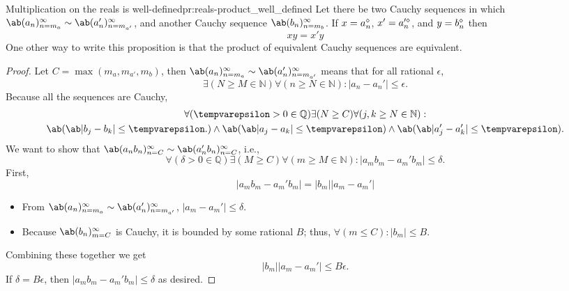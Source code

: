 \begin{prop}{Multiplication on the reals is well-defined}{pr:reals-product_well_defined}
  Let there be two Cauchy sequences in which
  $\sequence{a_n}{n = m_a}{\infty} \sim \sequence{a_n'}{n = m_{a'}}{\infty}$, and
  another Cauchy sequence $\sequence{b_n}{n = m_b}{\infty}$. If $x = a_n^{\diamond}$,
  $x' = a_n'^{\diamond}$, and $y = b_n^{\diamond}$ then
  \begin{equation}
    xy = x'y
  \end{equation}
  One other way to write this proposition is that the product of equivalent Cauchy
  sequences are equivalent.
\end{prop}

\begin{proof}
  Let $C = \max(m_a, m_{a'}, m_b)$, then
  $\sequence{a_n}{n = m_a}{\infty} \sim \sequence{a_n'}{n = m_{a'}}{\infty}$ means that
  for all rational $\epsilon$,
  \begin{equation}
    \exists (N \geq M \in \mathbb{N}) \forall (n \geq N \in \mathbb{N}) : |a_n - a_n'| \leq \epsilon.
  \end{equation}
  Because all the sequences are Cauchy,
  \begin{multline}
    \forall (\epsilon > 0 \in \mathbb{Q}) \exists (N \geq C) \forall (j, k \geq N \in \mathbb{N}) :                       \\
    \ab(\ab|b_j - b_k| \leq \epsilon.) \land \ab(\ab|a_j - a_k| \leq \epsilon) \land \ab(\ab|a_j' - a_k'| \leq \epsilon).
  \end{multline}
  We want to show that $\sequence{a_n b_n}{n = C}{\infty} \sim \sequence{a_n' b_n}{n = C}{\infty}$,
  i.e.,
  \begin{equation}
    \forall (\delta > 0 \in \mathbb{Q}) \exists (M \geq C) \forall (m \geq M \in \mathbb{N}) : |a_m b_m - a_m' b_m| \leq \delta.
  \end{equation}
  First,
  \begin{equation}
    |a_m b_m - a_m' b_m| = |b_m||a_m - a_m'|
  \end{equation}
  \begin{itemize}
    \item From $\sequence{a_n}{n = m_a}{\infty} \sim \sequence{a_n'}{n = m_{a'}}{\infty}$,
          $|a_m - a_m'| \leq \delta$.
    \item Because $\sequence{b_n}{m = C}{\infty}$ is Cauchy, it is bounded by some
          rational $B$; thus, $\forall (m \leq C) : |b_m| \leq B$.
  \end{itemize}
  Combining these together we get
  \begin{equation}
    |b_m||a_m - a_m'| \leq B\epsilon.
  \end{equation}
  If $\delta = B\epsilon$, then $|a_m b_m - a_m' b_m| \leq \delta$ as desired.
\end{proof}

